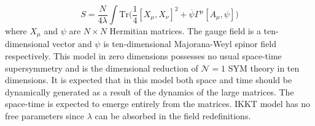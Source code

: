 \documentclass[11pt]{article}
\begin{document}
\begin{equation}
	\label{eq:IKKT} 
S = \frac{N}{4\lambda} \int \mbox{Tr} \Big( \frac{1}{4} [X_\mu, X_\nu]^{2} + \overline{\psi} \Gamma^{\mu} [A_{\mu},\psi] \Big) 
\end{equation}
where $X_{\mu}$ and $\psi$ are $N \times N$ Hermitian matrices. The gauge field is a ten-dimensional vector and $\psi$ is ten-dimensional Majorana-Weyl spinor field respectively. This model in zero dimensions possesses no usual space-time supersymmetry and is the dimensional reduction of $\mathcal{N}=1$ SYM theory in ten dimensions. 
It is expected that in this model both space and time should be dynamically generated as a result of the dynamics of the large matrices. 
The space-time is expected to emerge entirely from the matrices. 
IKKT model has no free parameters since $\lambda$ can be absorbed in the 
field redefinitions. 
\end{document}
